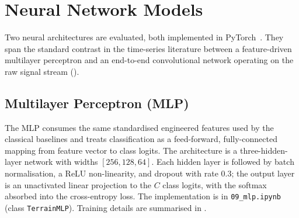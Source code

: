\begin{table}[H]
\centering
{}
\caption{Hyperparameter search grids and the configurations selected by \texttt{RandomizedSearchCV} on each classification problem. The \texttt{clf\_\_} prefix used by scikit-learn pipelines is omitted for readability. Tuning is implemented in \texttt{08\_base\_tuning.ipynb} (farm) and \texttt{08b\_base\_tuning\_dataset\_B\_3class.ipynb} (campus).}
\label{tab:tuned_hparams}
\end{table}

\section{Neural Network Models}
\label{sec:neural_models}

Two neural architectures are evaluated, both implemented in PyTorch~\cite{Paszke2019}. They span the standard contrast in the time-series literature between a feature-driven multilayer perceptron and an end-to-end convolutional network operating on the raw signal stream ().

\subsection{Multilayer Perceptron (MLP)}

The MLP consumes the same standardised engineered features used by the classical baselines and treats classification as a feed-forward, fully-connected mapping from feature vector to class logits. The architecture is a three-hidden-layer network with widths $[256, 128, 64]$. Each hidden layer is followed by batch normalisation, a ReLU non-linearity, and dropout with rate $0.3$; the output layer is an unactivated linear projection to the $C$ class logits, with the softmax absorbed into the cross-entropy loss. The implementation is in \texttt{09\_mlp.ipynb} (class \texttt{TerrainMLP}). Training details are summarised in .


